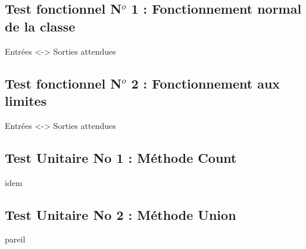 \documentclass[a4paper,french,10pt,twoside]{article}
\begin{document}
\subsection{Test fonctionnel N$^o$ 1 : Fonctionnement normal de la classe}
Entr\'ees <-> Sorties attendues

\subsection{Test fonctionnel N$^o$ 2 : Fonctionnement aux limites}
Entr\'ees <-> Sorties attendues

\subsection{Test Unitaire No 1 : M\'ethode Count}
idem

\subsection{Test Unitaire No 2 : M\'ethode Union}
pareil
\end{document}
